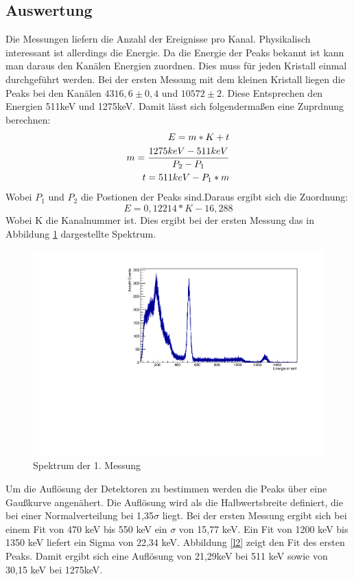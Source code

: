 \documentclass[a4paper,11pt,twoside]{article}
\begin{document}
\subsection{Auswertung}
Die Messungen liefern die Anzahl der Ereignisse pro Kanal. Physikalisch interessant ist allerdings die Energie. Da die Energie der Peaks bekannt ist kann man daraus den Kanälen Energien zuordnen. Dies muss für jeden Kristall einmal durchgeführt werden. Bei der ersten Messung mit dem kleinen Kristall liegen die Peaks bei den Kanälen $4316,6\pm0,4$ und $10572\pm2$. Diese Entsprechen den Energien 511keV und 1275keV.
Damit lässt sich folgendermaßen eine Zuprdnung berechnen:
\begin{align}
E=m*K+t\\
m={{1275keV-511keV}\over{P_2-P_1}}\\
t=511keV-P_1*m
\end{align}
Wobei $P_1$ und $P_2$ die Postionen der Peaks sind.Daraus ergibt sich die Zuordnung:
\begin{equation}
E=0,12214*K-16,288
\end{equation}
Wobei K die Kanalnummer ist.
Dies ergibt bei der ersten Messung das in Abbildung \ref{l1} dargestellte Spektrum.
\begin{figure}[H]
	\begin{center}
	\includegraphics[width=0.7\linewidth]{Messung11.pdf}
	\caption{Spektrum der 1. Messung}
	\label{l1}
	\end{center}
\end{figure}
Um die Auflösung der Detektoren zu bestimmen werden die Peaks über eine Gaußkurve angenähert. Die Auflösung wird als die Halbwertsbreite definiert, die bei einer Normalverteilung bei 1,35$\sigma$ liegt. Bei der ersten Messung ergibt sich bei einem Fit von 470 keV bis 550 keV ein $\sigma$ von 15,77 keV. Ein Fit von 1200 keV bis 1350 keV liefert ein Sigma von 22,34 keV. Abbildung \ref{l2} zeigt den Fit des ersten Peaks. Damit ergibt sich eine Auflösung von 21,29keV bei 511 keV sowie von 30,15 keV bei 1275keV.
\end{document}
